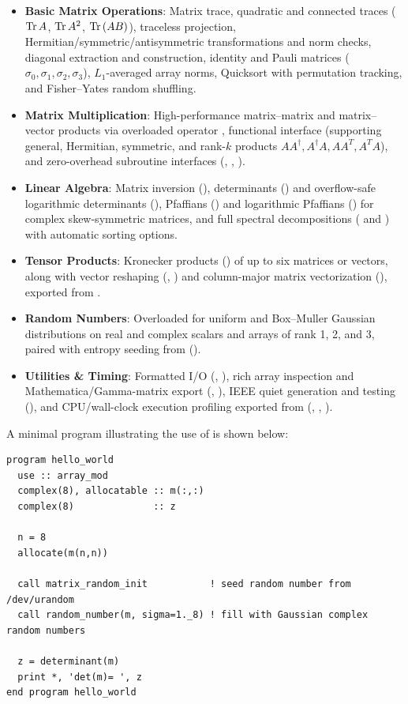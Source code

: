 \begin{itemize}
  \item \textbf{Basic Matrix Operations}: Matrix trace, quadratic and connected traces (${\rm Tr\,} A$, ${\rm Tr\,} A^2$, ${\rm Tr\,}(AB)$), traceless projection, Hermitian/symmetric/antisymmetric transformations and norm checks, diagonal extraction and construction, identity and Pauli matrices ($\sigma_0,\sigma_1,\sigma_2,\sigma_3$), $L_1$-averaged array norms, Quicksort with permutation tracking, and Fisher--Yates random shuffling.
  \item \textbf{Matrix Multiplication}: High-performance matrix--matrix and matrix--vector products via overloaded operator , functional interface  (supporting general, Hermitian, symmetric, and rank-$k$ products $A A^\dagger, A^\dagger A, A A^T, A^T A$), and zero-overhead subroutine interfaces (, , ).
  \item \textbf{Linear Algebra}: Matrix inversion (), determinants () and overflow-safe logarithmic determinants (), Pfaffians () and logarithmic Pfaffians () for complex skew-symmetric matrices, and full spectral decompositions ( and ) with automatic sorting options.
  \item \textbf{Tensor Products}: Kronecker products () of up to six matrices or vectors, along with vector reshaping (, ) and column-major matrix vectorization (), exported from .
  \item \textbf{Random Numbers}: Overloaded  for uniform and Box--Muller Gaussian distributions on real and complex scalars and arrays of rank 1, 2, and 3, paired with entropy seeding from  ().
  \item \textbf{Utilities \& Timing}: Formatted I/O (, ), rich array inspection and Mathematica/Gamma-matrix export (, ), IEEE quiet  generation and testing (), and CPU/wall-clock execution profiling exported from  (, , ).
\end{itemize}

A minimal program illustrating the use of  is shown below:
\lstset{language=[95]Fortran}
\begin{lstlisting}
program hello_world
  use :: array_mod
  complex(8), allocatable :: m(:,:)
  complex(8)              :: z

  n = 8
  allocate(m(n,n))

  call matrix_random_init           ! seed random number from /dev/urandom
  call random_number(m, sigma=1._8) ! fill with Gaussian complex random numbers

  z = determinant(m)
  print *, 'det(m)= ', z
end program hello_world
\end{lstlisting}

